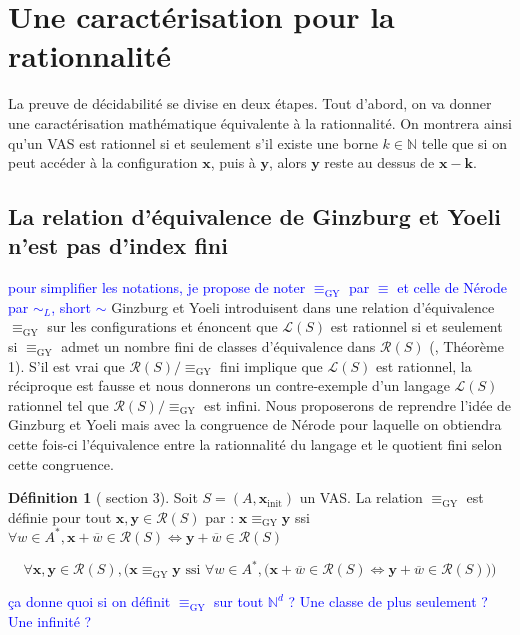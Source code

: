 \documentclass[a4paper,final]{article}
\theoremstyle{definition}
\newtheorem{Definition}[Theorem]{Définition}
\newcommand{\alain}[1]{\textcolor{blue}{#1}}
\newcommand{\N}{\ensuremath{\mathbb{N}}}
\newcommand{\lang}{\ensuremath{\mathcal{L}}}
\newcommand{\conf}{\ensuremath{\mathcal{R}}}
\newcommand{\vect}[1]{\ensuremath{\mathbf{#1}}}
\newcommand{\relGY}{\ensuremath{\equiv_\text{GY}}}
\newcommand{\ssi}{\ensuremath{\text{ ssi }}}
\newcommand{\equivaut}{\ensuremath{\Leftrightarrow}}
\newcommand{\xinit}{\ensuremath{\vect{x}_\text{init}}}
\newcommand{\valeur}[1]{\ensuremath{\overline{#1}}}
\begin{document}

\section{Une caractérisation pour la rationnalité}

La preuve de décidabilité se divise en deux étapes.
Tout d'abord, on va donner une caractérisation mathématique équivalente à la rationnalité.
On montrera ainsi qu'un VAS est rationnel si et seulement s'il existe une borne $k\in\N$ telle que si on peut accéder à la configuration $\vect{x}$, puis à $\vect{y}$, alors $\vect{y}$ reste au dessus de $\vect{x}-\vect{k}$.

\subsection{La relation d'équivalence de Ginzburg et Yoeli n'est pas d'index fini}
\alain{pour simplifier les notations, je propose de noter $\relGY$ par $\equiv$ et celle de Nérode par $\sim_L$, short $\sim$}
Ginzburg et Yoeli introduisent dans \cite{giyo80} une relation d'équivalence $\relGY$ sur les configurations et énoncent que $\lang(S)$ est rationnel si et seulement si $\relGY$ admet un nombre fini de classes d'équivalence dans $\conf(S)$ (\cite{giyo80}, Théorème 1). S'il est vrai que $\conf(S)/\relGY$ fini implique que $\lang(S)$ est rationnel, la réciproque est fausse et nous donnerons un contre-exemple d'un langage $\lang(S)$ rationnel tel que $\conf(S)/\relGY$ est infini. Nous proposerons de reprendre l'idée de Ginzburg et Yoeli mais avec la congruence de Nérode pour laquelle on obtiendra cette fois-ci l'équivalence entre la rationnalité du langage et le quotient fini selon cette congruence.

\begin{Definition}[\cite{giyo80} section 3]
Soit $S=(A,\xinit)$ un VAS. La relation $\relGY$ est définie pour tout $\vect{x},\vect{y}\in\conf(S)$ par : $ \vect{x}\relGY\vect{y}$  ssi 
 $ \forall w\in A^\ast, \vect{x} +\valeur{w}\in\conf(S) \equivaut \vect{y} +\valeur{w}\in\conf(S)$

$$\forall \vect{x},\vect{y}\in\conf(S), \Big(
\vect{x}\relGY\vect{y} \ssi \forall w\in A^\ast, \big( \vect{x} +\valeur{w}\in\conf(S) \equivaut \vect{y} +\valeur{w}\in\conf(S) \big) \Big)$$
\end{Definition}\alain{ça donne quoi si on définit $\relGY$ sur tout $\N^d$ ? Une classe de plus seulement ? Une infinité ?}
\end{document}
